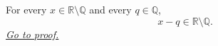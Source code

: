 \begin{lemma}
\label{lem:irrational-minus-rational-is-irrational}
For every $x\in\mathbb{R}\setminus\mathbb{Q}$ and every $q\in\mathbb{Q}$,
\[
  x-q\in\mathbb{R}\setminus\mathbb{Q}.
\]
\hyperref[prf:irrational-minus-rational-is-irrational]{\textit{Go to proof.}}
\end{lemma}